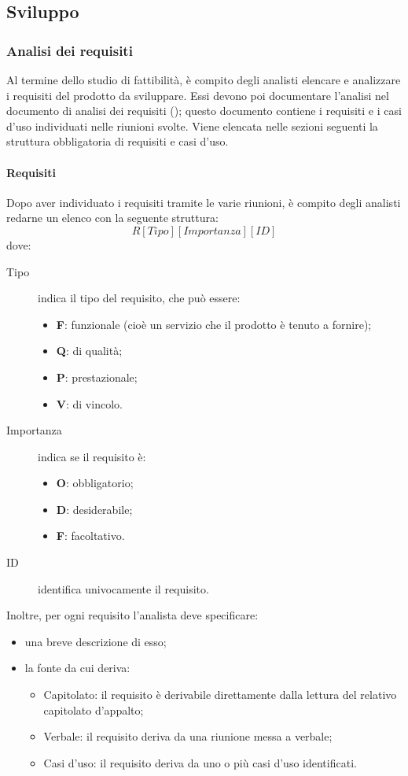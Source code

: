 \subsection{Sviluppo}
	\subsubsection{Analisi dei requisiti}
	Al termine dello studio di fattibilità, è compito degli analisti elencare e analizzare i requisiti del prodotto da sviluppare. Essi devono poi documentare l'analisi nel documento di analisi dei requisiti (\AdR); questo documento contiene i requisiti e i casi d'uso individuati nelle riunioni svolte.
	Viene elencata nelle sezioni seguenti la struttura obbligatoria di requisiti e casi d'uso.
		\paragraph{Requisiti} 
		Dopo aver individuato i requisiti tramite le varie riunioni, è compito degli analisti redarne un elenco con la seguente struttura:
			\[R[Tipo][Importanza][ID]\]
		dove:
		\begin{description}
			\item[Tipo] indica il tipo del requisito, che può essere:
				\begin{itemize}
					\item \textbf{F}: funzionale (cioè un servizio che il prodotto è tenuto a fornire);
					\item \textbf{Q}: di qualità;
					\item \textbf{P}: prestazionale;
					\item \textbf{V}: di vincolo.
			\end{itemize}
			\item[Importanza] indica se il requisito è:
			\begin{itemize}
				\item \textbf{O}: obbligatorio;
				\item \textbf{D}: desiderabile;
				\item \textbf{F}: facoltativo. 
			\end{itemize}
			
			\item[ID] identifica univocamente il requisito.
		\end{description}
		Inoltre, per ogni requisito l'analista deve specificare:
		\begin{itemize}
			\item una breve descrizione di esso;
			\item la fonte da cui deriva:
			\begin{itemize}
				\item Capitolato: il requisito è derivabile direttamente dalla lettura del relativo capitolato d'appalto;
				\item Verbale: il requisito deriva da una riunione messa a verbale;
				\item Casi d'uso: il requisito deriva da uno o più casi d'uso identificati.
			\end{itemize}
		\end{itemize}
